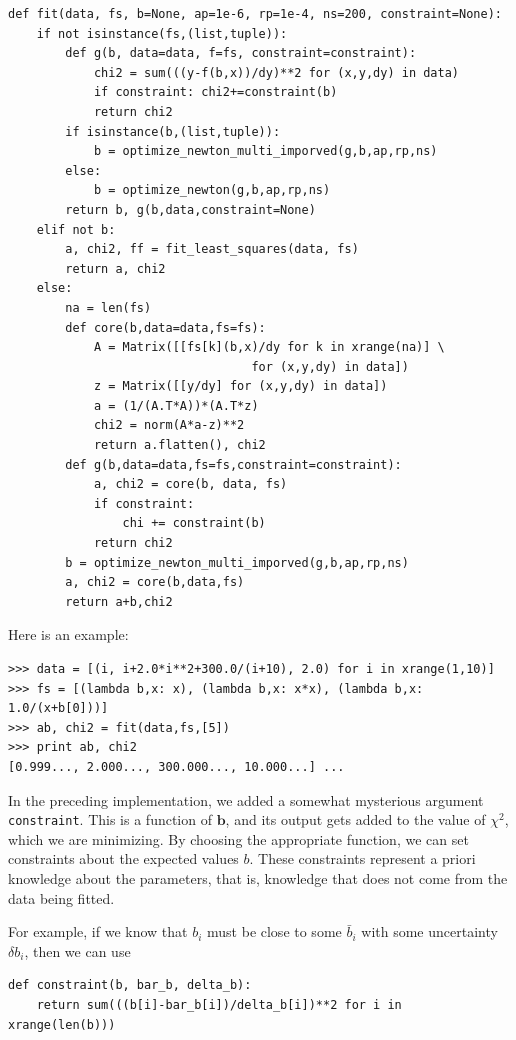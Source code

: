\documentclass[justified,sixbynine]{tufte-book}
\def\ft{\small\tt}
\theoremstyle{plain}%
\theoremstyle{definition}
\theoremstyle{remark}
\begin{document}
\begin{fullwidth}
\begin{lstlisting}[caption={in file: {\ft nlib.py}}]
def fit(data, fs, b=None, ap=1e-6, rp=1e-4, ns=200, constraint=None):
    if not isinstance(fs,(list,tuple)):
        def g(b, data=data, f=fs, constraint=constraint):
            chi2 = sum(((y-f(b,x))/dy)**2 for (x,y,dy) in data)
            if constraint: chi2+=constraint(b)
            return chi2
        if isinstance(b,(list,tuple)):
            b = optimize_newton_multi_imporved(g,b,ap,rp,ns)
        else:
            b = optimize_newton(g,b,ap,rp,ns)
        return b, g(b,data,constraint=None)
    elif not b:
        a, chi2, ff = fit_least_squares(data, fs)
        return a, chi2
    else:
        na = len(fs)
        def core(b,data=data,fs=fs):
            A = Matrix([[fs[k](b,x)/dy for k in xrange(na)] \
                                  for (x,y,dy) in data])
            z = Matrix([[y/dy] for (x,y,dy) in data])
            a = (1/(A.T*A))*(A.T*z)
            chi2 = norm(A*a-z)**2
            return a.flatten(), chi2
        def g(b,data=data,fs=fs,constraint=constraint):
            a, chi2 = core(b, data, fs)
            if constraint:
                chi += constraint(b)
            return chi2
        b = optimize_newton_multi_imporved(g,b,ap,rp,ns)
        a, chi2 = core(b,data,fs)
        return a+b,chi2
\end{lstlisting}

Here is an example:

\begin{lstlisting}
>>> data = [(i, i+2.0*i**2+300.0/(i+10), 2.0) for i in xrange(1,10)]
>>> fs = [(lambda b,x: x), (lambda b,x: x*x), (lambda b,x: 1.0/(x+b[0]))]
>>> ab, chi2 = fit(data,fs,[5])
>>> print ab, chi2
[0.999..., 2.000..., 300.000..., 10.000...] ...
\end{lstlisting}


In the preceding implementation, we added a somewhat mysterious argument {\ft constraint}. This is a function of $\mathbf{b}$, and its output gets added to the value of $\chi^2$, which we are minimizing. By choosing the appropriate function, we can set constraints about the expected values $b$. These constraints represent a priori knowledge about the parameters, that is, knowledge that does not come from the data being fitted.

For example, if we know that $b_i$ must be close to some $\bar b_i$ with some uncertainty $\delta b_i$, then we can use
\begin{lstlisting}
def constraint(b, bar_b, delta_b):
    return sum(((b[i]-bar_b[i])/delta_b[i])**2 for i in xrange(len(b)))
\end{lstlisting}


\end{fullwidth}
\end{document}
